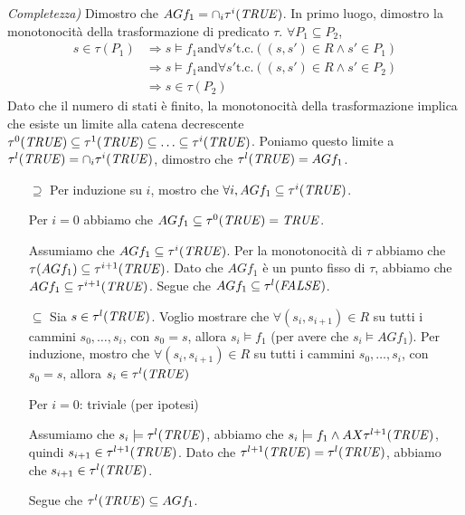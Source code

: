 \documentclass[12pt]{article}
\newcommand{\T}{\ensuremath{\textrm{\emph{TRUE}}}\xspace}
\newcommand{\F}{\ensuremath{\textrm{\emph{FALSE}}}\xspace}
\begin{document}
\textit{Completezza)} Dimostro che $AG f_1 = \cap_i \tau^i(\textrm{\T})$.
In primo luogo, dimostro la monotonocità della trasformazione di predicato $\tau$. $\forall P_1 \subseteq P_2$,
\begin{align*}
s\in \tau(P_1) &\Rightarrow s \models f_1 \textrm{and} \forall s' \textrm{t.c.} ((s,s') \in R \land s' \in P_1)\\
               &\Rightarrow s \models f_1 \textrm{and} \forall s' \textrm{t.c.} ((s,s') \in R \land s' \in P_2)\\
			   &\Rightarrow s\in \tau(P_2)
\end{align*}
Dato che il numero di stati è finito, la monotonocità della trasformazione implica che esiste un limite alla catena decrescente $\tau^0(\T) \subseteq \tau^1(\T) \subseteq \ldots \subseteq \tau^i(\T)$.
Poniamo questo limite a $\tau^l(\T)=\cap_i \tau^i(\T)$, dimostro che $\tau^l(\T)=AG f_1$.
\begin{itemize}
\item[$\supseteq$] Per induzione su $i$, mostro che $\forall i,AG f_1 \subseteq \tau^i(\T)$.

	Per $i=0$ abbiamo che $AG f_1 \subseteq \tau^0(\T) = \T$.
	
	Assumiamo che $AG f_1 \subseteq \tau^i(\T)$. Per la monotonocità di $\tau$ abbiamo che $\tau(AG f_1) \subseteq \tau^{i+1}(\T)$. Dato che $AG f_1$ è un punto fisso di $\tau$, abbiamo che $AG f_1 \subseteq \tau^{i+1}(\T)$. Segue che $AG f_1 \subseteq \tau^l(\F)$.
\item[$\subseteq$] Sia $s \in \tau^l(\T)$. Voglio mostrare che $\forall (s_i,s_{i+1}) \in R$ su tutti i cammini $s_0, \ldots, s_i$, con $s_0 = s$, allora $s_i \models f_1$ (per avere che $s_i \models AG f_1$). 
	Per induzione, mostro che $\forall (s_i,s_{i+1}) \in R$ su tutti i cammini $s_0, \ldots, s_i$, con $s_0 = s$, allora $s_i \in \tau^l(\T)$

	Per $i=0$: triviale (per ipotesi)
	
	Assumiamo che $s_i \models \tau^l(\T)$, abbiamo che $s_i \models f_1 \land AX\tau^{l+1}(\T)$, quindi $s_{i+1} \in \tau^{l+1}(\T)$. Dato che $\tau^{l+1}(\T)=\tau^l(\T)$, abbiamo che $s_{i+1} \in \tau^l(\T)$.
	
	Segue che $\tau^l(\T) \subseteq AG f_1 $.
\end{itemize}
\end{document}
